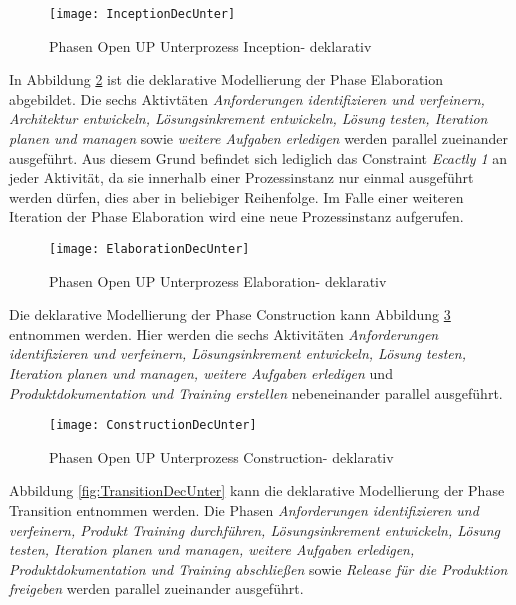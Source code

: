 \begin{figure}[htp]
\begin{center}
  \texttt{[image: InceptionDecUnter]} %
  \caption{Phasen Open UP Unterprozess Inception- deklarativ}
  \label{fig:InceptionDecUnter}
\end{center}
\end{figure}

In Abbildung \ref{fig:ElaborationDecUnter} ist die deklarative Modellierung der Phase Elaboration abgebildet. Die sechs Aktivtäten \textit{Anforderungen identifizieren und verfeinern, Architektur entwickeln, Lösungsinkrement entwickeln, Lösung testen, Iteration planen und managen} sowie \textit{weitere Aufgaben erledigen} werden parallel zueinander ausgeführt. Aus diesem Grund befindet sich lediglich das Constraint \textit{Ecactly 1} an jeder Aktivität, da sie innerhalb einer Prozessinstanz nur einmal ausgeführt werden dürfen, dies aber in beliebiger Reihenfolge. Im Falle einer weiteren Iteration der Phase Elaboration wird eine neue Prozessinstanz aufgerufen. \newline

\begin{figure}[htp]
\begin{center}
  \texttt{[image: ElaborationDecUnter]} %
  \caption{Phasen Open UP Unterprozess Elaboration- deklarativ} 
  \label{fig:ElaborationDecUnter}
\end{center}
\end{figure}

Die deklarative Modellierung der Phase Construction kann Abbildung \ref{fig:ConstructionDecUnter} entnommen werden. Hier werden die sechs Aktivitäten \textit{Anforderungen identifizieren und verfeinern, Lösungsinkrement entwickeln, Lösung testen, Iteration planen und managen, weitere Aufgaben erledigen} und \textit{Produktdokumentation und Training erstellen} nebeneinander parallel ausgeführt.
\begin{figure}[htp]
\begin{center}
  \texttt{[image: ConstructionDecUnter]} %
  \caption{Phasen Open UP Unterprozess Construction- deklarativ}
  \label{fig:ConstructionDecUnter}
\end{center}
\end{figure}

Abbildung \ref{fig:TransitionDecUnter} kann die deklarative Modellierung der Phase Transition entnommen werden.\newline
Die Phasen \textit{Anforderungen identifizieren und verfeinern, Produkt Training durchführen, Lösungsinkrement entwickeln, Lösung testen, Iteration planen und managen, weitere Aufgaben erledigen, Produktdokumentation und Training abschließen} sowie \textit{Release für die Produktion freigeben} werden parallel zueinander ausgeführt.

